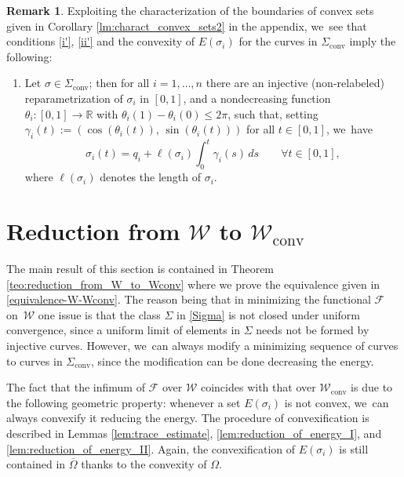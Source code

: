 \documentclass[11pt]{article}
\numberwithin{equation}{section}
\newcommand{\R}{\mathbb{R}}
\newcommand{\largercomp}{\mathcal W}
\let\curves\Sigma
\let\len\ell
\let\Om\Omega
\newcommand\admclassconv{{\mathcal W_\mathrm{conv}}}
\newcommand\convexcurves{\curves_\mathrm{conv}}
\theoremstyle{definition}
\newtheorem{remark}[theorem]{Remark}
\begin{document}
\begin{remark}\label{rem:condition_P}
Exploiting the characterization of the boundaries of convex sets
given in Corollary \ref{lm:charact_convex_sets2} in the appendix, we~see that conditions \ref{i'}, \ref{ii'} and the convexity of $E(\sigma_i)$ for the curves in $\convexcurves$ imply the following:

\begin{enumerate}[label=(P),wide]
\item\label{(P)} Let $\sigma\in \convexcurves$; then for all $i=1,\dots, n$ there are an injective (non-relabeled) reparametrization of $\sigma_i$ in $[0,1]$, and a
nondecreasing function $\theta_i\colon[0,1]\to\R$
with $\theta_i(1)-\theta_i(0)\le2\pi$,
such that, setting $\gamma_i(t):=(\cos(\theta_i(t)),\,\sin(\theta_i(t)))$ for all $t\in[0,1]$, we~have
\begin{equation*}
\sigma_i(t)=q_i+\len(\sigma_i)\int_0^t\gamma_i(s)\,ds\quad \quad\forall t\in[0,1],
\end{equation*}
where $\len(\sigma_i)$ denotes the length of $\sigma_i$.
\end{enumerate}
\end{remark}

\section{ Reduction from \texorpdfstring{$\largercomp$ to $\admclassconv$}{W}}
\label{sec:reduction_from_W_to_Wconv}

The main result of this section is contained in Theorem
\ref{teo:reduction_from_W_to_Wconv} where we prove the equivalence given in \eqref{equivalence-W-Wconv}. The reason being that in minimizing the functional
${\mathcal F}$ on~$\largercomp$ one issue is that the class $\curves$ in \eqref{Sigma}
is not closed under uniform convergence, since
a uniform limit of elements
in $\curves$ needs not be formed by injective curves. {However, we~can always modify a minimizing sequence of curves to curves in $\convexcurves$, since the modification can be done decreasing the energy.}

The fact that the infimum of $\mathcal F$ over $\mathcal W$ coincides with that over $\admclassconv$ is due to the following geometric property: whenever a set $E(\sigma_i)$ is not convex, we~can always convexify it reducing the energy. The procedure of convexification is described in Lemmas \ref{lem:trace_estimate}, \ref{lem:reduction_of_energy_I}, and \ref{lem:reduction_of_energy_II}. Again, the convexification of $E(\sigma_i)$ is still contained in $\overline\Omega$ thanks to the convexity of $\Om$.
\end{document}
